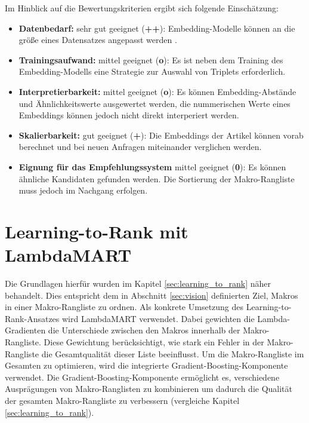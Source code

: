 Im Hinblick auf die Bewertungskriterien ergibt sich folgende Einschätzung: 

\begin{itemize}
    \item \textbf{Datenbedarf:} sehr gut geeignet (\textbf{++}): Embedding-Modelle können an die größe eines Datensatzes angepasst werden \parencite{Goodfellow2016DeepLearning, Hagan2014NeuralNetworkDesign}.
    \item \textbf{Trainingsaufwand:} mittel geeignet (\textbf{o}): Es ist neben dem Training des Embedding-Modells eine Strategie zur Auswahl von Triplets erforderlich. 
    \item \textbf{Interpretierbarkeit:} mittel geeignet (\textbf{o}): Es können Embedding-Abstände und Ähnlichkeitswerte ausgewertet werden, die nummerischen Werte eines Embeddings können jedoch nicht direkt interperiert werden.  
    \item \textbf{Skalierbarkeit:} gut geeignet (\textbf{+}): Die Embeddings der Artikel können vorab berechnet und bei neuen Anfragen miteinander verglichen werden.
    \item \textbf{Eignung für das Empfehlungssystem} mittel geeignet (\textbf{0}): Es können ähnliche Kandidaten gefunden werden. Die Sortierung der Makro-Rangliste muss jedoch im Nachgang erfolgen. 
\end{itemize} 

\section{Learning-to-Rank mit LambdaMART} 
\label{sec:eignung_learning_to_rank} 

Die Grundlagen hierfür wurden im Kapitel \ref{sec:learning_to_rank} näher behandelt.
Dies entspricht dem in Abschnitt \ref{sec:vision} definierten Ziel, Makros in einer Makro-Rangliste zu ordnen. 
Als konkrete Umsetzung des Learning-to-Rank-Ansatzes wird LambdaMART verwendet.
Dabei gewichten die Lambda-Gradienten die Unterschiede zwischen den Makros innerhalb der Makro-Rangliste.
Diese Gewichtung berücksichtigt, wie stark ein Fehler in der Makro-Rangliste die Gesamtqualität dieser Liste beeinflusst.
Um die Makro-Rangliste im Gesamten zu optimieren, wird die integrierte Gradient-Boosting-Komponente verwendet. Die Gradient-Boosting-Komponente ermöglicht es, 
verschiedene Ausprägungen von Makro-Ranglisten zu kombinieren um dadurch die Qualität der gesamten Makro-Rangliste zu verbessern (vergleiche Kapitel \ref{sec:learning_to_rank}).

